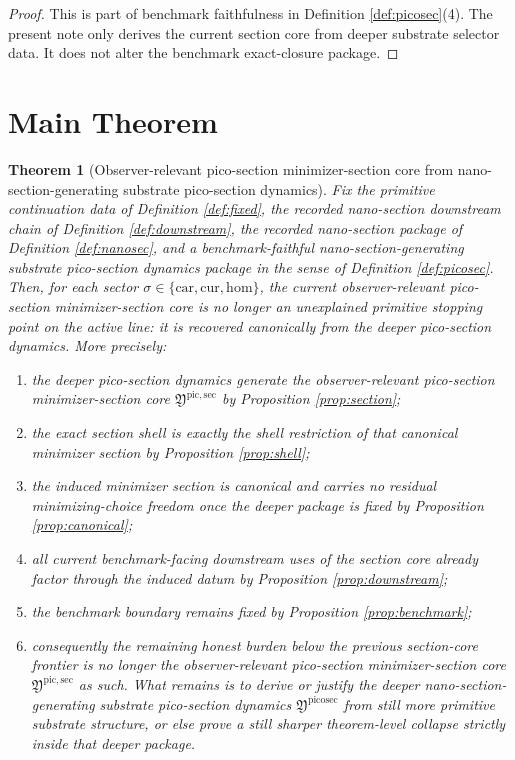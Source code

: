 \documentclass[11pt]{article}
\newcommand{\Car}{\mathrm{car}}
\newcommand{\Cur}{\mathrm{cur}}
\newcommand{\Hom}{\mathrm{hom}}
\newcommand{\PicoSectionPackage}{\mathfrak Y^{\mathrm{picosec}}}
\newcommand{\PicoMinSectionCore}{\mathfrak Y^{\mathrm{pic,sec}}}
\newtheorem{theorem}{Theorem}
\begin{document}
\begin{proof}
This is part of benchmark faithfulness in Definition \ref{def:picosec}(4). The present note only derives the current section core from deeper substrate selector data. It does not alter the benchmark exact-closure package.
\end{proof}

\section{Main Theorem}

\begin{theorem}[Observer-relevant pico-section minimizer-section core from nano-section-generating substrate pico-section dynamics]
\label{thm:main}
Fix the primitive continuation data of Definition \ref{def:fixed}, the recorded nano-section downstream chain of Definition \ref{def:downstream}, the recorded nano-section package of Definition \ref{def:nanosec}, and a benchmark-faithful nano-section-generating substrate pico-section dynamics package in the sense of Definition \ref{def:picosec}. Then, for each sector \(\sigma\in\{\Car,\Cur,\Hom\}\), the current observer-relevant pico-section minimizer-section core is no longer an unexplained primitive stopping point on the active line: it is recovered canonically from the deeper pico-section dynamics. More precisely:
\begin{enumerate}
    \item the deeper pico-section dynamics generate the observer-relevant pico-section minimizer-section core \(\PicoMinSectionCore\) by Proposition \ref{prop:section};
    \item the exact section shell is exactly the shell restriction of that canonical minimizer section by Proposition \ref{prop:shell};
    \item the induced minimizer section is canonical and carries no residual minimizing-choice freedom once the deeper package is fixed by Proposition \ref{prop:canonical};
    \item all current benchmark-facing downstream uses of the section core already factor through the induced datum by Proposition \ref{prop:downstream};
    \item the benchmark boundary remains fixed by Proposition \ref{prop:benchmark};
    \item consequently the remaining honest burden below the previous section-core frontier is no longer the observer-relevant pico-section minimizer-section core \(\PicoMinSectionCore\) as such. What remains is to derive or justify the deeper nano-section-generating substrate pico-section dynamics \(\PicoSectionPackage\) from still more primitive substrate structure, or else prove a still sharper theorem-level collapse strictly inside that deeper package.
\end{enumerate}
\end{theorem}
\end{document}
